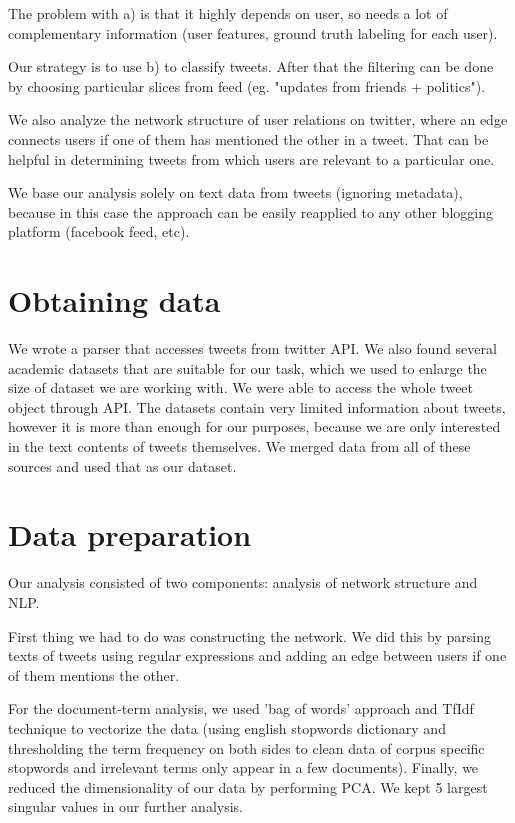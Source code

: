 \documentclass[%
 reprint,
 amsmath,amssymb,
 aps,
]{revtex4-1}
\begin{document}
The problem with a) is that it highly depends on user, so needs a lot of complementary information (user features, ground truth labeling for each user).

Our strategy is to use b) to classify tweets. After that the filtering can be done by choosing particular slices from feed (eg. "updates from friends + politics").

We also analyze the network structure of user relations on twitter, where an edge connects users if one of them has mentioned the other in a tweet. That can be helpful in determining tweets from which users are relevant to a particular one.

We base our analysis solely on text data from tweets (ignoring metadata), because in this case the approach can be easily reapplied to any other blogging platform (facebook feed, etc).



\section{Obtaining data}
We wrote a parser that accesses tweets from twitter API.
We also found several academic datasets \cite{sentiment140, sanalyt} that are suitable for our task, which we used to enlarge the size of dataset we are working with.
We were able to access the whole tweet object through API.
The datasets contain very limited information about tweets, however it is more than enough for our purposes, because we are only interested in the text contents of tweets themselves.
We merged data from all of these sources and used that as our dataset.



\section{Data preparation}

Our analysis consisted of two components: analysis of network structure and NLP.

First thing we had to do was constructing the network. We did this by parsing texts of tweets using regular expressions and adding an edge between users if one of them mentions the other.

For the document-term analysis, we used 'bag of words' approach and TfIdf technique to vectorize the data (using english stopwords dictionary and thresholding the term frequency on both sides to clean data of corpus specific stopwords and irrelevant terms only appear in a few documents). Finally, we reduced the dimensionality of our data by performing PCA. We kept 5 largest singular values in our further analysis.
\end{document}
